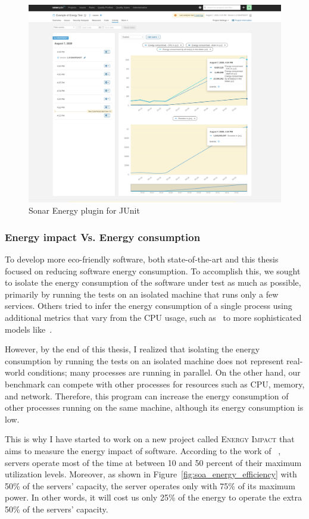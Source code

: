 \begin{figure}[!h]
      \centering
      \includegraphics[width=.8\linewidth]{chapters/JunitSonarplugin}
      \caption{Sonar Energy plugin for JUnit}
      \label{fig:JunitSonarplugin}
\end{figure}


\subsubsection{Energy impact Vs. Energy consumption}
To develop more eco-friendly software, both state-of-the-art and this thesis focused on reducing software energy consumption.
To accomplish this, we sought to isolate the energy consumption of the software under test as much as possible, primarily by running the tests on an isolated machine that runs only a few services.
Others tried to infer the energy consumption of a single process using additional metrics that vary from the CPU usage, such as~\cite{noureddine-issta-2016} to more sophisticated models like~\cite{fieni2020smartwatts,fieni2021selfwatts}.

However, by the end of this thesis, I realized that isolating the energy consumption by running the tests on an isolated machine does not represent real-world conditions; many processes are running in parallel.
On the other hand, our benchmark can compete with other processes for resources such as CPU, memory, and network.
Therefore, this program can increase the energy consumption of other processes running on the same machine, although its energy consumption is low.

This is why I have started to work on a new project called \textsc{Energy Impact} that aims to measure the energy impact of software.
According to the work of \citeauthor{barroso2007case}~\cite{barroso2007case}, servers operate most of the time at between 10 and 50 percent of their maximum utilization levels.
Moreover, as shown in Figure~\ref{fig:soa_energy_efficiency} with 50\% of the servers' capacity, the server operates only with 75\% of its maximum power.
In other words, it will cost us only 25\% of the energy to operate the extra 50\% of the servers' capacity.


